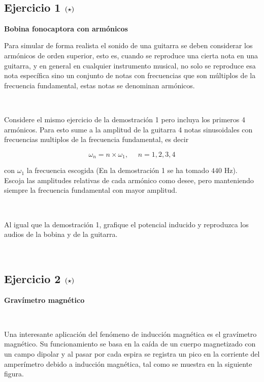 \
\subsection*{Ejercicio 1 \large{$\left( \star \right)$}}

\textbf{Bobina fonocaptora con armónicos}

Para simular de forma realista el sonido de una guitarra se deben considerar
los armónicos de orden superior, esto es, cuando se reproduce una cierta
nota en una guitarra, y en general en cualquier instrumento musical, no solo
se reproduce esa nota específica sino un conjunto de notas con frecuencias
que son múltiplos de la frecuencia fundamental, estas notas se denominan 
armónicos. 

\

Considere el mismo ejercicio de la demostración 1 pero incluya los primeros
4 armónicos. Para esto sume a la amplitud de la guitarra 4 notas sinusoidales
con frecuencias multiplos de la frecuencia fundamental, es decir

\[ \omega_n = n \times \omega_1,\ \ \ \ \ \ n=1,2,3,4 \]

con $\omega_1$ la frecuencia escogida (En la demostración 1 se ha tomado 
$440$ Hz). Escoja las amplitudes relativas de cada armónico como desee, pero
manteniendo siempre la frecuencia fundamental con mayor amplitud. 

\

Al igual que la demostración 1, grafique el potencial inducido y reproduzca
los audios de la bobina y de la guitarra.

\

\subsection*{Ejercicio 2 \large{$\left( \star \right)$}}

\textbf{Gravímetro magnético}

\

Una interesante aplicación del fenómeno de inducción magnética es el
gravímetro magnético. Su funcionamiento se basa en la caída de un cuerpo
magnetizado con un campo dipolar y al pasar por cada espira se registra un
pico en la corriente del amperímetro debido a inducción magnética, tal
como se muestra en la siguiente figura.

